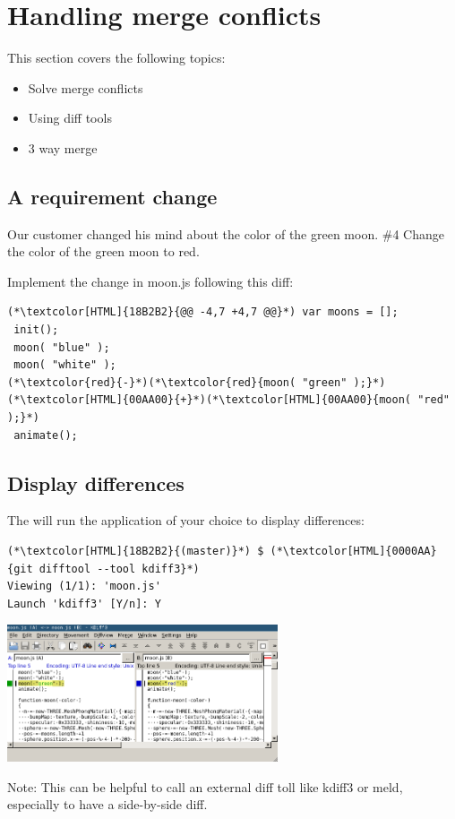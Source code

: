 \section{Handling merge conflicts}
\begin{frame}[fragile]
  \slidetitle
  This section covers the following topics:
  \begin{itemize}
    \pause
    \item Solve merge conflicts
    \pause
    \item Using diff tools
    \pause
    \item 3 way merge
  \end{itemize}
\end{frame}

\subsection{A requirement change}
\begin{frame}[fragile]
    \subslidetitle
  Our customer changed his mind about the color of the green moon.
  \newline \vspace{1em}
  \#4 Change the color of the green moon to red.

  Implement the change in moon.js following this diff:
\begin{lstlisting}
(*\textcolor[HTML]{18B2B2}{@@ -4,7 +4,7 @@}*) var moons = [];
 init();
 moon( "blue" );
 moon( "white" );
(*\textcolor{red}{-}*)(*\textcolor{red}{moon( "green" );}*)
(*\textcolor[HTML]{00AA00}{+}*)(*\textcolor[HTML]{00AA00}{moon( "red" );}*)
 animate();
\end{lstlisting}

\end{frame}

\subsection{Display differences}
\begin{frame}[fragile]
    \subslidetitle
  The  will run the application of your choice to display differences:
  \begin{lstlisting}
(*\textcolor[HTML]{18B2B2}{(master)}*) $ (*\textcolor[HTML]{0000AA}{git difftool --tool kdiff3}*)
Viewing (1/1): 'moon.js'
Launch 'kdiff3' [Y/n]: Y
\end{lstlisting}

  \vspace{1em}
  \centerline{\includegraphics[width=8cm]{../screen/git-difftool-kdiff3.png}}

  Note: This can be helpful to call an external diff toll like kdiff3 or meld, especially to have a side-by-side diff.

\end{frame}


